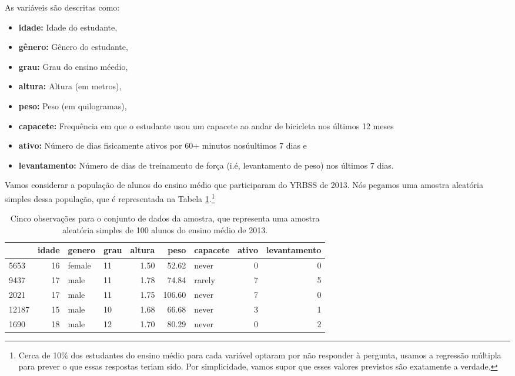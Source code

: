 \documentclass[
]{book}
\theoremstyle{definition}
\theoremstyle{definition}
\theoremstyle{definition}
\theoremstyle{definition}
\theoremstyle{remark}
\begin{document}
As variáveis são descritas como:

\begin{itemize}
\item
  \textbf{idade:} Idade do estudante,
\item
  \textbf{gênero:} Gênero do estudante,
\item
  \textbf{grau:} Grau do ensino méedio,
\item
  \textbf{altura:} Altura (em metros),
\item
  \textbf{peso:} Peso (em quilogramas),
\item
  \textbf{capacete:} Frequência em que o estudante usou um capacete ao andar de bicicleta nos últimos 12 meses
\item
  \textbf{ativo:} Número de dias fisicamente ativos por 60+ minutos nosúultimos 7 dias e
\item
  \textbf{levantamento:} Número de dias de treinamento de força (i.é, levantamento de peso) nos últimos 7 dias.
\end{itemize}

Vamos considerar a população de alunos do ensino médio que participaram do YRBSS de 2013. Nós pegamos uma amostra aleatória simples dessa população, que é representada na Tabela \ref{tab:yrbssSampDF}.\footnote{Cerca de 10\% dos estudantes do ensino médio para cada variável optaram por não responder à pergunta, usamos a regressão múltipla para prever o que essas respostas teriam sido. Por simplicidade, vamos supor que esses valores previstos são exatamente a verdade.}

\begin{table}

\caption{\label{tab:yrbssSampDF}Cinco observações para o conjunto de dados da amostra, que representa uma amostra aleatória simples de 100 alunos do ensino médio de 2013.}
\centering
\begin{tabular}[t]{l|r|l|l|r|r|l|r|r}
\hline
  & idade & genero & grau & altura & peso & capacete & ativo & levantamento\\
\hline
5653 & 16 & female & 11 & 1.50 & 52.62 & never & 0 & 0\\
\hline
9437 & 17 & male & 11 & 1.78 & 74.84 & rarely & 7 & 5\\
\hline
2021 & 17 & male & 11 & 1.75 & 106.60 & never & 7 & 0\\
\hline
12187 & 15 & male & 10 & 1.68 & 66.68 & never & 3 & 1\\
\hline
1690 & 18 & male & 12 & 1.70 & 80.29 & never & 0 & 2\\
\hline
\end{tabular}
\end{table}
\end{document}
